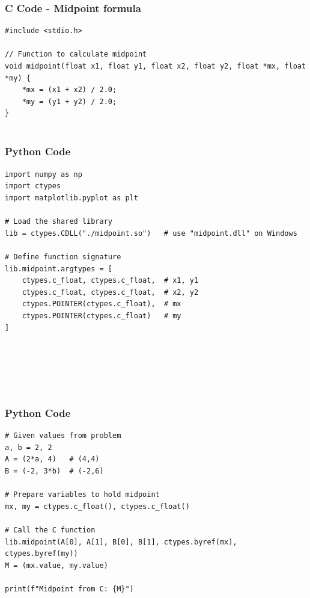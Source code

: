 \documentclass{beamer}
\begin{document}
\begin{frame}[fragile]
    \frametitle{C Code - Midpoint formula }

    \begin{lstlisting}
#include <stdio.h>

// Function to calculate midpoint
void midpoint(float x1, float y1, float x2, float y2, float *mx, float *my) {
    *mx = (x1 + x2) / 2.0;
    *my = (y1 + y2) / 2.0;
}


    \end{lstlisting}
\end{frame}


\begin{frame}[fragile]
    \frametitle{Python Code}
    \begin{lstlisting}
import numpy as np
import ctypes
import matplotlib.pyplot as plt

# Load the shared library
lib = ctypes.CDLL("./midpoint.so")   # use "midpoint.dll" on Windows

# Define function signature
lib.midpoint.argtypes = [
    ctypes.c_float, ctypes.c_float,  # x1, y1
    ctypes.c_float, ctypes.c_float,  # x2, y2
    ctypes.POINTER(ctypes.c_float),  # mx
    ctypes.POINTER(ctypes.c_float)   # my
]






    \end{lstlisting}
\end{frame}

\begin{frame}[fragile]
    \frametitle{Python Code}
    \begin{lstlisting}
# Given values from problem
a, b = 2, 2
A = (2*a, 4)   # (4,4)
B = (-2, 3*b)  # (-2,6)

# Prepare variables to hold midpoint
mx, my = ctypes.c_float(), ctypes.c_float()

# Call the C function
lib.midpoint(A[0], A[1], B[0], B[1], ctypes.byref(mx), ctypes.byref(my))
M = (mx.value, my.value)

print(f"Midpoint from C: {M}")





    \end{lstlisting}
\end{frame}
\end{document}
